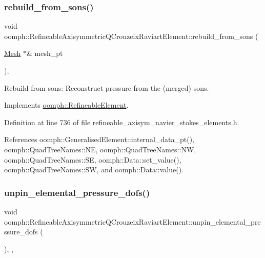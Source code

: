 \subsubsection{\texorpdfstring{rebuild\+\_\+from\+\_\+sons()}{rebuild\_from\_sons()}}
{\footnotesize\ttfamily void oomph\+::\+Refineable\+Axisymmetric\+Q\+Crouzeix\+Raviart\+Element\+::rebuild\+\_\+from\+\_\+sons (\begin{DoxyParamCaption}\item[{\hyperlink{classoomph_1_1Mesh}{Mesh} $\ast$\&}]{mesh\+\_\+pt }\end{DoxyParamCaption})\hspace{0.3cm}{\ttfamily [inline]}, {\ttfamily [virtual]}}



Rebuild from sons\+: Reconstruct pressure from the (merged) sons. 



Implements \hyperlink{classoomph_1_1RefineableElement_a33324be27833fa4b78279d17158215fa}{oomph\+::\+Refineable\+Element}.



Definition at line 736 of file refineable\+\_\+axisym\+\_\+navier\+\_\+stokes\+\_\+elements.\+h.



References oomph\+::\+Generalised\+Element\+::internal\+\_\+data\+\_\+pt(), oomph\+::\+Quad\+Tree\+Names\+::\+NE, oomph\+::\+Quad\+Tree\+Names\+::\+NW, oomph\+::\+Quad\+Tree\+Names\+::\+SE, oomph\+::\+Data\+::set\+\_\+value(), oomph\+::\+Quad\+Tree\+Names\+::\+SW, and oomph\+::\+Data\+::value().

\mbox{\label{classoomph_1_1RefineableAxisymmetricQCrouzeixRaviartElement_a03db4e96e84be516b30ee13ec075a939}} 
\subsubsection{\texorpdfstring{unpin\+\_\+elemental\+\_\+pressure\+\_\+dofs()}{unpin\_elemental\_pressure\_dofs()}}
{\footnotesize\ttfamily void oomph\+::\+Refineable\+Axisymmetric\+Q\+Crouzeix\+Raviart\+Element\+::unpin\+\_\+elemental\+\_\+pressure\+\_\+dofs (\begin{DoxyParamCaption}{ }\end{DoxyParamCaption})\hspace{0.3cm}{\ttfamily [inline]}, {\ttfamily [private]}, {\ttfamily [virtual]}}



